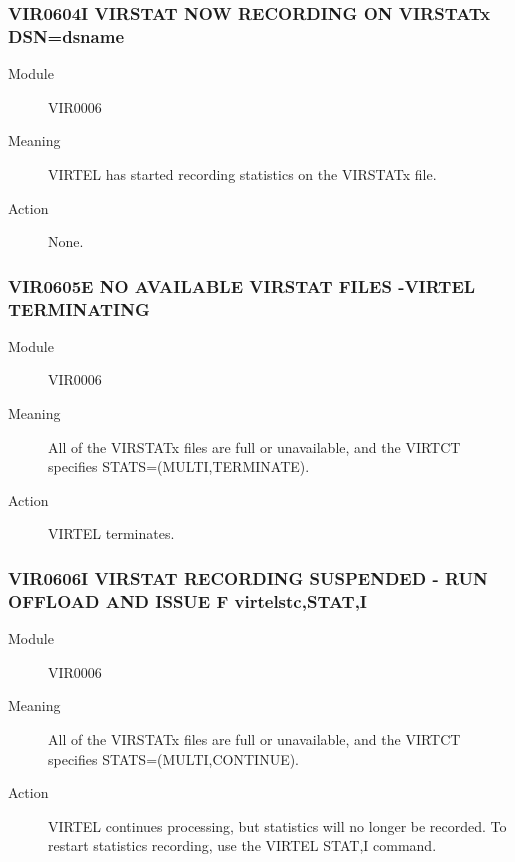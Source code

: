 \documentclass[letterpaper,10pt,english]{sphinxmanual}
\begin{document}
\subsubsection{VIR0604I VIRSTAT NOW RECORDING ON VIRSTATx DSN=dsname}
\label{\detokenize{messages:vir0604i-virstat-now-recording-on-virstatx-dsn-dsname}}\begin{description}
\item[{Module}] \leavevmode
VIR0006

\item[{Meaning}] \leavevmode
VIRTEL has started recording statistics on the VIRSTATx file.

\item[{Action}] \leavevmode
None.

\end{description}


\subsubsection{VIR0605E NO AVAILABLE VIRSTAT FILES -VIRTEL TERMINATING}
\label{\detokenize{messages:vir0605e-no-available-virstat-files-virtel-terminating}}\begin{description}
\item[{Module}] \leavevmode
VIR0006

\item[{Meaning}] \leavevmode
All of the VIRSTATx files are full or unavailable, and the VIRTCT specifies STATS=(MULTI,TERMINATE).

\item[{Action}] \leavevmode
VIRTEL terminates.

\end{description}


\subsubsection{VIR0606I VIRSTAT RECORDING SUSPENDED - RUN OFFLOAD AND ISSUE F virtelstc,STAT,I}
\label{\detokenize{messages:vir0606i-virstat-recording-suspended-run-offload-and-issue-f-virtelstc-stat-i}}\begin{description}
\item[{Module}] \leavevmode
VIR0006

\item[{Meaning}] \leavevmode
All of the VIRSTATx files are full or unavailable, and the VIRTCT specifies STATS=(MULTI,CONTINUE).

\item[{Action}] \leavevmode
VIRTEL continues processing, but statistics will no longer be recorded. To restart statistics recording, use the VIRTEL STAT,I command.

\end{description}
\end{document}
